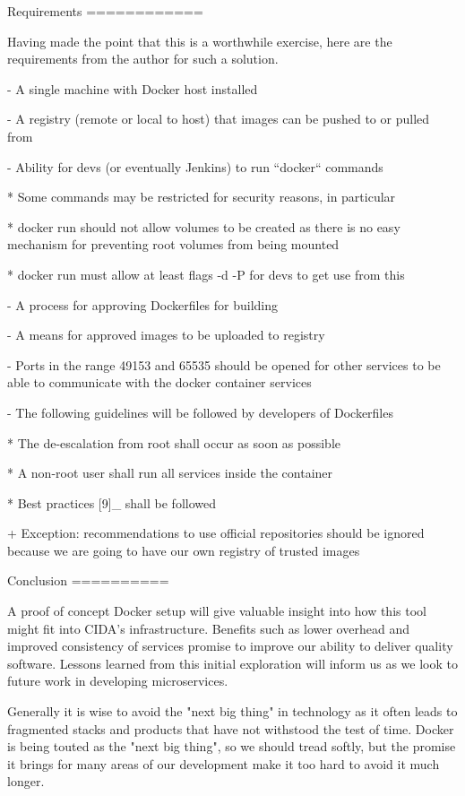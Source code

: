 Requirements
============

Having made the point that this is a worthwhile exercise, here are the
requirements from the author for such a solution.

- A single machine with Docker host installed

- A registry (remote or local to host) that images can be pushed to or pulled
  from

- Ability for devs (or eventually Jenkins) to run ``docker`` commands

  * Some commands may be restricted for security reasons, in particular

  * docker run should not allow volumes to be created as there is no easy
    mechanism for preventing root volumes from being mounted

  * docker run must allow at least flags -d -P for devs to get use from this

- A process for approving Dockerfiles for building

- A means for approved images to be uploaded to registry

- Ports in the range 49153 and 65535 should be opened for other services to
  be able to communicate with the docker container services

- The following guidelines will be followed by developers of Dockerfiles

  * The de-escalation from root shall occur as soon as possible

  * A non-root user shall run all services inside the container

  * Best practices [9]_ shall be followed

    + Exception: recommendations to use official repositories should be
      ignored because we are going to have our own registry of trusted images

Conclusion
==========

A proof of concept Docker setup will give valuable insight into how this tool
might fit into CIDA's infrastructure.  Benefits such as lower overhead and
improved consistency of services promise to improve our ability to deliver
quality software.  Lessons learned from this initial exploration will inform
us as we look to future work in developing microservices.

Generally it is wise to avoid the "next big thing" in technology as it often
leads to fragmented stacks and products that have not withstood the test of
time.  Docker is being touted as the "next big thing", so we should tread
softly, but the promise it brings for many areas of our development make it
too hard to avoid it much longer.

